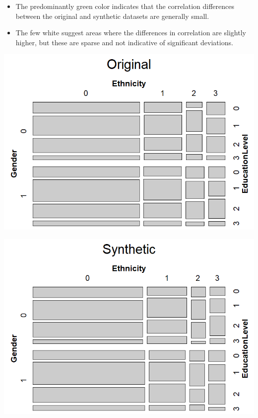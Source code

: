 \documentclass[a0,portrait]{a0poster}
\begin{document}
\begin{multicols}{3}
\begin{itemize}
    \item The predominantly green color indicates that the correlation differences between the original and synthetic datasets are generally small.
    \item The few white suggest areas where the differences in correlation are slightly higher, but these are sparse and not indicative of significant deviations.
\end{itemize}

\columnbreak %

\includegraphics[width=1\linewidth]{Poster TEX/figures/Mosaic_orig_v4.png}

\includegraphics[width=1\linewidth]{Poster TEX/figures/Mosaic_synt_v4.png}


\end{multicols}
\end{document}
